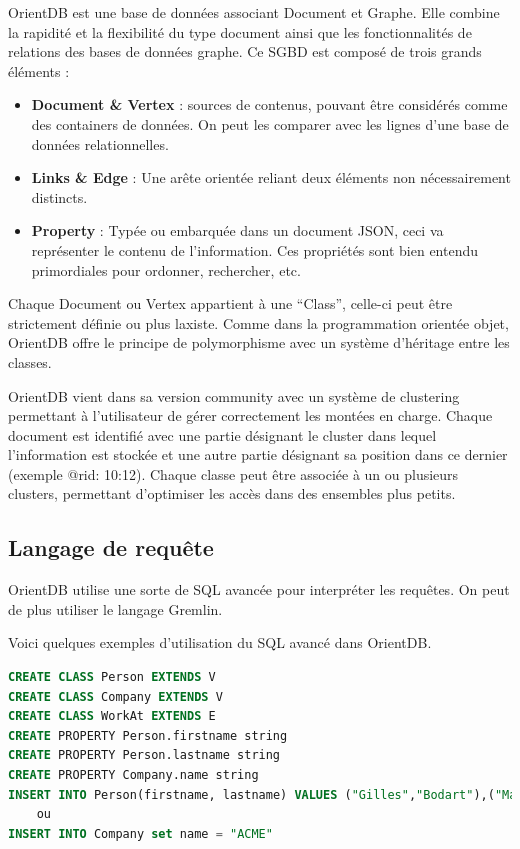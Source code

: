 \documentclass[a4paper,fleqn,12pt,oneside]{report}
\begin{document}
OrientDB est une base de données associant Document et Graphe. Elle combine la rapidité et la flexibilité du type document ainsi que les fonctionnalités de relations des bases de données graphe.
\newpage
Ce SGBD est composé de trois grands éléments :

\begin{itemize}
\item \textbf{Document \& Vertex} : sources de contenus, pouvant être considérés comme des containers de données. On peut les comparer avec les lignes d'une base de données relationnelles.
\item \textbf{Links \& Edge} : Une arête orientée reliant deux éléments non nécessairement distincts.
\item \textbf{Property} : Typée ou embarquée dans un document JSON, ceci va représenter le contenu de l'information. Ces propriétés sont bien entendu primordiales pour ordonner, rechercher, etc.
\end{itemize}

Chaque Document ou Vertex appartient à une \enquote{Class}, celle-ci peut être strictement définie ou plus laxiste. Comme dans la programmation orientée objet, OrientDB offre le principe de polymorphisme avec un système d'héritage entre les classes. 

OrientDB vient dans sa version community avec un système de clustering permettant à l’utilisateur de gérer correctement les montées en charge. Chaque document est identifié avec une partie désignant le cluster dans lequel l’information est stockée et une autre partie désignant sa position dans ce dernier (exemple @rid: 10:12). Chaque classe peut être associée à un ou plusieurs clusters, permettant d’optimiser les accès dans des ensembles plus petits.


\subsection{Langage de requête}

OrientDB utilise une sorte de SQL avancée pour interpréter les requêtes. On peut de plus utiliser le langage Gremlin.

Voici quelques exemples d'utilisation du SQL avancé dans OrientDB.

\begin{lstlisting}[language=SQL]
CREATE CLASS Person EXTENDS V
CREATE CLASS Company EXTENDS V
CREATE CLASS WorkAt EXTENDS E
CREATE PROPERTY Person.firstname string
CREATE PROPERTY Person.lastname string
CREATE PROPERTY Company.name string
INSERT INTO Person(firstname, lastname) VALUES ("Gilles","Bodart"),("Marie","Van Cutsem")
	ou
INSERT INTO Company set name = "ACME"

\end{lstlisting}
\end{document}
